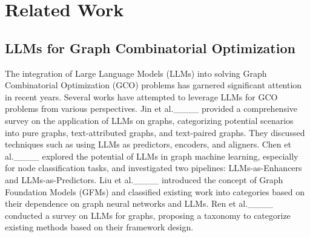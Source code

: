 \section{Related Work}
\subsection{LLMs for Graph Combinatorial Optimization}

The integration of Large Language Models (LLMs) into solving Graph Combinatorial Optimization (GCO) problems has garnered significant attention in recent years. Several works have attempted to leverage LLMs for GCO problems from various perspectives. Jin et al.____ provided a comprehensive survey on the application of LLMs on graphs, categorizing potential scenarios into pure graphs, text-attributed graphs, and text-paired graphs. They discussed techniques such as using LLMs as predictors, encoders, and aligners. Chen et al.____ explored the potential of LLMs in graph machine learning, especially for node classification tasks, and investigated two pipelines: LLMs-as-Enhancers and LLMs-as-Predictors. Liu et al.____ introduced the concept of Graph Foundation Models (GFMs) and classified existing work into categories based on their dependence on graph neural networks and LLMs. Ren et al.____ conducted a survey on LLMs for graphs, proposing a taxonomy to categorize existing methods based on their framework design.

